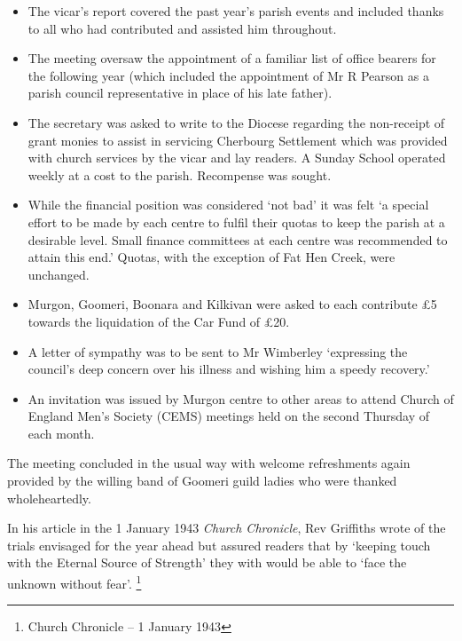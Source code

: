 \begin{itemize}
\item
  The vicar's report covered the past year's parish events and included
  thanks to all who had contributed and assisted him throughout.
\item
  The meeting oversaw the appointment of a familiar list of office
  bearers for the following year (which included the appointment of Mr R
  Pearson as a parish council representative in place of his late
  father).
\item
  The secretary was asked to write to the Diocese regarding the
  non-receipt of grant monies to assist in servicing Cherbourg
  Settlement which was provided with church services by the vicar and
  lay readers. A Sunday School operated weekly at a cost to the parish.
  Recompense was sought.
\item
  While the financial position was considered `not bad' it was felt `a
  special effort to be made by each centre to fulfil their quotas to
  keep the parish at a desirable level. Small finance committees at each
  centre was recommended to attain this end.' Quotas, with the exception
  of Fat Hen Creek, were unchanged.
\item
  Murgon, Goomeri, Boonara and Kilkivan were asked to each contribute \pounds5
  towards the liquidation of the Car Fund of \pounds20.
\item
  A letter of sympathy was to be sent to Mr Wimberley `expressing the
  council's deep concern over his illness and wishing him a speedy
  recovery.'
\item
  An invitation was issued by Murgon centre to other areas to attend
  Church of England Men's Society (CEMS) meetings held on the second
  Thursday of each month.
\end{itemize}

The meeting concluded in the usual way with welcome refreshments again
provided by the willing band of Goomeri guild ladies who were thanked
wholeheartedly.

In his article in the 1 January 1943 \emph{Church Chronicle}, Rev
Griffiths wrote of the trials envisaged for the year ahead but assured
readers that by `keeping touch with the Eternal Source of Strength' they
with would be able to `face the unknown without fear'. \footnote{Church
  Chronicle -- 1 January 1943}

